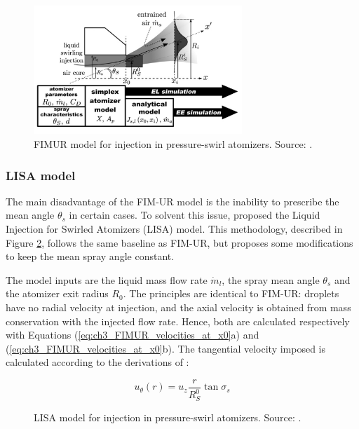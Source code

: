 \begin{figure}[ht]
    \centering
    \includegraphics[width=0.7\textwidth]{./part1_numerical_approaches/figures_ch3/FIMUR}
       \centering
    \caption[FIMUR model for injection in pressure-swirl atomizers]{FIMUR model for injection in pressure-swirl atomizers. Source: .}
    \label{fig:FIMUR_methodology}
\end{figure}

\newpage

\subsubsection*{LISA model}

The main disadvantage of the FIM-UR model is the inability to prescribe the mean angle $\theta_s$ in certain cases. To solvent this issue,  proposed the Liquid Injection for Swirled Atomizers (LISA) model. This methodology, described in Figure \ref{fig:LISA_methodology}, follows the same baseline as FIM-UR, but proposes some modifications to keep the mean spray angle constant.

The model inputs are the liquid mass flow rate $\dot{m}_l$, the spray mean angle $\theta_s$ and the atomizer exit radius $R_0$. The principles are identical to FIM-UR: droplets have no radial velocity at injection, and the axial velocity is obtained from mass conservation with the injected flow rate. Hence, both are calculated respectively with Equations (\ref{eq:ch3_FIMUR_velocities_at_x0}a) and (\ref{eq:ch3_FIMUR_velocities_at_x0}b). The tangential velocity imposed is calculated according to the derivations of :

\begin{equation}
u_\theta \left( r \right) = u_z  \frac{r}{R_S^0} \tan \sigma_s
\end{equation}


\begin{figure}[ht]
    \centering
       \centering
    \caption{LISA model for injection in pressure-swirl atomizers. Source: .}
    \label{fig:LISA_methodology}
\end{figure}



